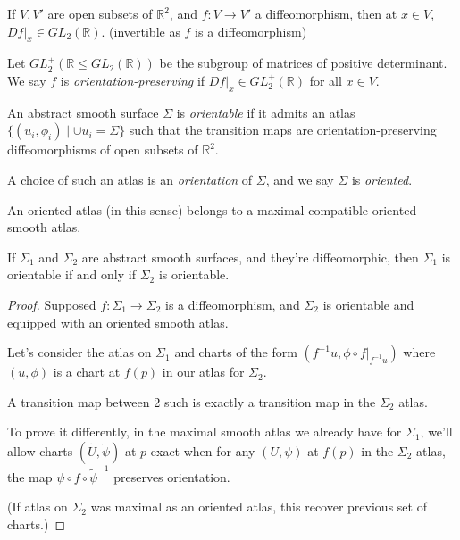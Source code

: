 If \(V, V'\) are open subsets of \(\mathbb{R}^2\), and \(f: V \to V'\) a diffeomorphism, then at \(x \in V\), \(\left.Df\right|_x \in GL_2(\mathbb{R})\). (invertible as \(f\) is a diffeomorphism)

Let \(GL^+_2(\mathbb{R}\leq GL_2(\mathbb{R}))\) be the subgroup of matrices of positive determinant. We say \(f\) is \textit{orientation-preserving} if \(\left. Df\right|_x \in GL^+_2(\mathbb{R})\) for all \(x \in V\).

\begin{definition}{}{}
    An abstract smooth surface \(\Sigma\) is \textit{orientable}  if it admits an atlas \(\{(u_i, \phi_i)\mid \cup u_i = \Sigma\}\) such that the transition maps are orientation-preserving diffeomorphisms of open subsets of \(\mathbb{R}^2\).

    A choice of such an atlas is an \textit{orientation} of \(\Sigma\), and we say \(\Sigma\) is \textit{oriented}.
\end{definition}
\begin{remark}
    An oriented atlas (in this sense) belongs to a maximal compatible oriented smooth atlas.
\end{remark}
\begin{lemma}{}{}
    If \(\Sigma_1\) and \(\Sigma_2\) are abstract smooth surfaces, and they're diffeomorphic, then \(\Sigma_1\) is orientable if and only if \(\Sigma_2\) is orientable.
\end{lemma}
\begin{proof}
    Supposed \(f: \Sigma_1 \to \Sigma_2\) is a diffeomorphism, and \(\Sigma_2\) is orientable and equipped with an oriented smooth atlas.

    Let's consider the atlas on \(\Sigma_1\) and charts of the form \((f^{-1}u, \left. \phi\circ f \right|_{f^{-1}u})\) where \((u, \phi)\) is a chart at \(f(p)\) in our atlas for \(\Sigma_2\).

    A transition map between 2 such is exactly a transition map in the \(\Sigma_2\) atlas.

    To prove it differently, in the maximal smooth atlas we already have for \(\Sigma_1\), we'll allow charts \((\tilde{U}, \tilde{\psi})\) at \(p\) exact when for any \((U, \psi)\) at \(f(p)\) in the \(\Sigma_2\) atlas, the map \(\psi\circ f \circ \tilde{\psi}^{-1}\) preserves orientation.

    (If atlas on \(\Sigma_2\) was maximal as an oriented atlas, this recover previous set of charts.)
\end{proof}
